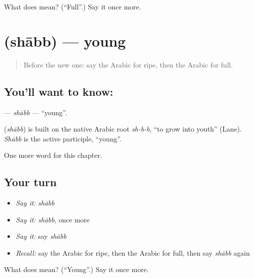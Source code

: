 \begin{tcolorbox}[breakable,colback=teal!4,colframe=teal!35!black,title={Before you move on}]
What does  mean? (\textquotedblleft{}Full\textquotedblright{}.) Say it once more.
\end{tcolorbox}
\section[\texorpdfstring{\ar{شاب} (shābb)}{شاب (shābb)}]{ (shābb) — young}

\label{lesson:AR-C154-shabb}



\begin{quote}
Before the new one: say the Arabic for ripe, then the Arabic for full.
\end{quote}

\subsection*{You'll want to know: }
\textbf{} — \emph{shābb} — \textquotedblleft{}young\textquotedblright{}.

\begin{cousinweb}
\textbf{} (\emph{shābb}) is built on the native Arabic root \emph{sh-b-b}, \textquotedblleft{}to grow into youth\textquotedblright{} (Lane). \emph{Shābb} is the active participle, \textquotedblleft{}young\textquotedblright{}.
\end{cousinweb}

\begin{grammarlens}[title={What you've built}]
One more word for this chapter.
\end{grammarlens}

\subsection*{Your turn}
\begin{itemize}
\raggedright
  \item \emph{Say it:} \emph{shābb}
  \item \emph{Say it:} \emph{shābb}, once more
  \item \emph{Say it:} say \emph{shābb}
  \item \emph{Recall:} say the Arabic for ripe, then the Arabic for full, then say \emph{shābb} again
\end{itemize}

\begin{tcolorbox}[breakable,colback=teal!4,colframe=teal!35!black,title={Before you move on}]
What does  mean? (\textquotedblleft{}Young\textquotedblright{}.) Say it once more.
\end{tcolorbox}
